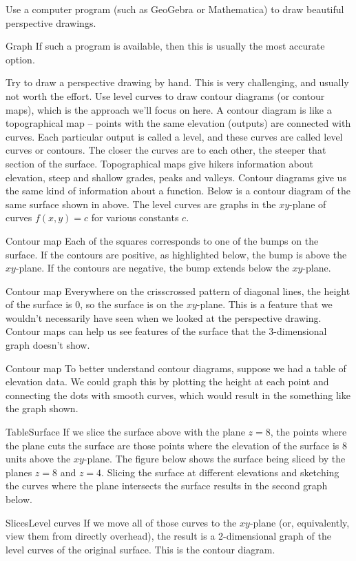 Use a computer program (such as GeoGebra or Mathematica) to draw beautiful perspective drawings.

Graph
If such a program is available, then this is usually the most accurate option.

Try to draw a perspective drawing by hand. This is very challenging, and usually not worth the effort.
Use level curves to draw contour diagrams (or contour maps), which is the approach we'll focus on here. A contour diagram is like a topographical map -- points with the same elevation (outputs) are connected with curves. Each particular output is called a level, and these curves are called level curves or contours. The closer the curves are to each other, the steeper that section of the surface. Topographical maps give hikers information about elevation, steep and shallow grades, peaks and valleys. Contour diagrams give us the same kind of information about a function.
Below is a contour diagram of the same surface shown in above. The level curves are graphs in the $xy$-plane of curves $f(x,y)=c$ for various constants $c$.

Contour map
Each of the squares corresponds to one of the bumps on the surface. If the contours are positive, as highlighted below, the bump is above the $xy$-plane. If the contours are negative, the bump extends below the $xy$-plane.

Contour map
Everywhere on the crisscrossed pattern of diagonal lines, the height of the surface is 0, so the surface is on the $xy$-plane. This is a feature that we wouldn't necessarily have seen when we looked at the perspective drawing. Contour maps can help us see features of the surface that the 3-dimensional graph doesn't show.

Contour map
To better understand contour diagrams, suppose we had a table of elevation data. We could graph this by plotting the height at each point and connecting the dots with smooth curves, which would result in the something like the graph shown.

TableSurface
If we slice the surface above with the plane $z=8$, the points where the plane cuts the surface are those points where the elevation of the surface is 8 units above the $xy$-plane. The figure below shows the surface being sliced by the planes $z=8$ and $z=4$. Slicing the surface at different elevations and sketching the curves where the plane intersects the surface results in the second graph below.

SlicesLevel curves
If we move all of those curves to the $xy$-plane (or, equivalently, view them from directly overhead), the result is a 2-dimensional graph of the level curves of the original surface. This is the contour diagram.

